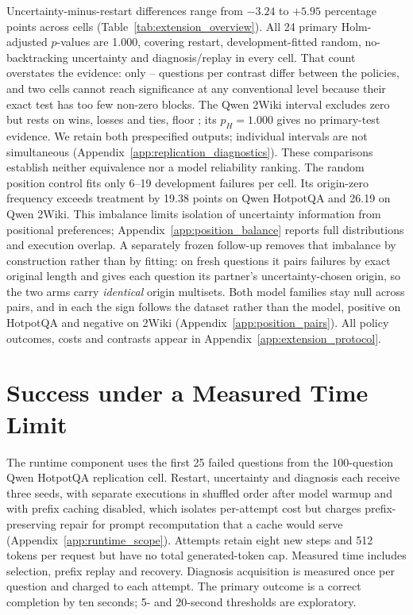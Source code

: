 \documentclass{article}
\begin{document}
Uncertainty-minus-restart differences range from $-3.24$ to $+5.95$
percentage points across cells (Table~\ref{tab:extension_overview}).
All 24 primary Holm-adjusted $p$-values are 1.000, covering restart,
development-fitted random, no-backtracking uncertainty and diagnosis/replay
in every cell. That count overstates the evidence: only
\RepNonzeroLow{}--\RepNonzeroHigh{} questions per contrast differ between the
policies, and two cells cannot reach significance at any conventional level
because their exact test has too few non-zero blocks. The Qwen 2Wiki interval
excludes zero but rests on \RepExampleWins{} wins, \RepExampleLosses{} losses
and \RepExampleTies{} ties, floor \RepExampleFloor{}; its $p_H=1.000$ gives no
primary-test evidence. We retain both prespecified outputs; individual
intervals are not simultaneous
(Appendix~\ref{app:replication_diagnostics}).
These comparisons establish neither equivalence nor a model reliability ranking.
The random position control fits only 6--19 development failures per cell.
Its origin-zero frequency exceeds treatment by 19.38 points on Qwen HotpotQA
and 26.19 on Qwen 2Wiki. This imbalance limits isolation of uncertainty
information from positional preferences; Appendix~\ref{app:position_balance}
reports full distributions and execution overlap. A separately frozen
follow-up removes that imbalance by construction rather than by fitting: on
\PairCohort{} fresh questions it pairs failures by exact original length and
gives each question its partner's uncertainty-chosen origin, so the two arms
carry \emph{identical} origin multisets. Both model families stay null across
\PairPairs{} pairs, and in each the sign follows the dataset rather than the
model, positive on HotpotQA and negative on 2Wiki
(Appendix~\ref{app:position_pairs}). All policy outcomes, costs and contrasts
appear in Appendix~\ref{app:extension_protocol}.

\section{Success under a Measured Time Limit}
\label{sec:runtime}
The runtime component uses the first 25 failed questions from the
100-question Qwen HotpotQA replication cell.
Restart, uncertainty and diagnosis each receive three seeds, with separate
executions in shuffled order after model warmup and with prefix caching
disabled, which isolates per-attempt cost but charges prefix-preserving repair
for prompt recomputation that a cache would serve
(Appendix~\ref{app:runtime_scope}). Attempts retain eight new steps and 512 tokens per request but
have no total generated-token cap. Measured time includes selection,
prefix replay and recovery. Diagnosis acquisition is measured once per
question and charged to each attempt. The primary outcome is a correct
completion by ten seconds; 5- and 20-second thresholds are exploratory.
\end{document}
